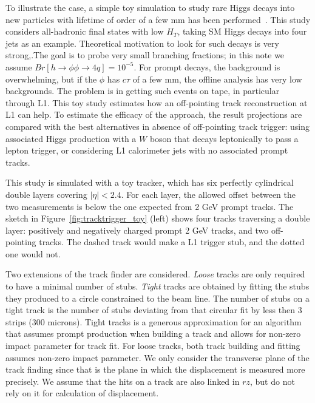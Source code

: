 To illustrate the case, a simple toy simulation to study rare Higgs decays into new particles with lifetime of order of a few mm has been performed~\cite{Gershtein:2017tsv}. 
This study considers all-hadronic final states with low $H_T$, taking SM Higgs decays into four jets as an example.
Theoretical motivation to look for such decays is very strong,.The goal is to probe very small
branching fractions; in this note we assume $Br[h\rightarrow\phi\phi\rightarrow 4q] = 10^{-5}$. 
For prompt decays, the background is overwhelming, but if the $\phi$ has $c\tau$ of a few mm, the offline analysis has very low 
backgrounds.
The problem is in getting such events on tape, in particular through L1. This toy study estimates how an off-pointing track reconstruction 
at L1 can help. To estimate the efficacy of the approach, the result projections are compared with the best alternatives in absence of off-pointing track trigger: using
associated Higgs production with a $W$ boson that decays leptonically to pass a lepton trigger, or considering L1 calorimeter jets with no associated 
prompt tracks.

This study is simulated with a toy tracker, which has six perfectly cylindrical double layers \cite{geom} covering $|\eta|<2.4$. 
For each layer, the allowed offset between the two measurements
is below the one expected from 2 GeV prompt tracks. 
The sketch in Figure~\ref{fig:tracktrigger_toy} (left) shows four tracks traversing a double layer: positively and negatively charged 
prompt 2 GeV tracks, and two off-pointing tracks. The dashed track would make a L1 trigger stub, and the dotted one would not. 

Two extensions of the track finder are considered. {\it Loose} tracks are only required to have a minimal number of stubs. 
{\it Tight} tracks are obtained by fitting the stubs they produced to a circle constrained to the beam line. The number of stubs on a tight track
is the number of stubs deviating from that circular fit by less then 3 strips (300 microns). Tight tracks is a generous approximation for 
an algorithm that assumes prompt production when building a track and allows for non-zero impact parameter for track fit.
For loose tracks, both track building and fitting assumes non-zero impact parameter. We only consider the transverse plane of the track finding
since that is the plane in which the displacement is measured more precisely. We assume that the hits on a track are also linked in  $rz$, but do 
not rely on it for calculation of displacement. 

